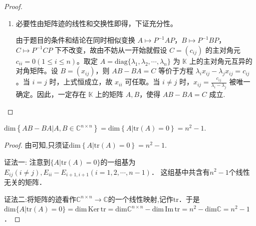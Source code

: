 \documentclass[../../main.tex]{subfiles}%
\begin{document}
\begin{proof}
\begin{enumerate}[(1)]
\item 必要性由矩阵迹的线性和交换性即得，下证充分性。

由于题目的条件和结论在同时相似变换 $A\mapsto P^{-1}AP$，$B\mapsto P^{-1}BP$，$C\mapsto P^{-1}CP$ 下不改变，故由不妨从一开始就假设 $C=(c_{ij})$ 的主对角元 $c_{ii}=0 (1\leqslant  i\leqslant  n)$。取定 $A = \mathrm{diag}\{\lambda_1,\lambda_2,\cdots,\lambda_n\}$ 为 $\mathbb{K}$ 上的主对角元互异的对角矩阵。设 $B=(x_{ij})$，则 $AB - BA = C$ 等价于方程 $\lambda_ix_{ij}-\lambda_jx_{ij}=c_{ij}$。当 $i = j$ 时，上式恒成立，故 $x_{ii}$ 可任取。当 $i\neq j$ 时，$x_{ij}=\frac{c_{ij}}{\lambda_i - \lambda_j}$ 被唯一确定。因此，一定存在 $\mathbb{K}$ 上的矩阵 $A,B$，使得 $AB - BA = C$ 成立.
\end{enumerate}

\end{proof}

\begin{corollary}\label{corollary:AB-BA的维数等于迹零矩阵的维数}
$\mathrm{dim}\left\{ AB-BA|A,B\in \mathbb{C} ^{n\times n} \right\} =\mathrm{dim}\left\{ A|\mathrm{tr}\left( A \right) =0 \right\} =n^2-1.$
\end{corollary}
\begin{proof}

由可知,只须证$\mathrm{dim}\left\{ A|\mathrm{tr}\left( A \right) =0 \right\} =n^2-1.$

{\color{blue} 证法一:}
注意到$\{ A|\mathrm{tr}(A) =0 \}$的一组基为  
$E_{ij}(i\ne j),E_{ii}-E_{i+1,i+1}(i=1,2,\cdots,n-1)$．  
这组基中共含有$n^2-1$个线性无关的矩阵．  

{\color{blue} 证法二:}将矩阵的迹看作$\mathbb{C} ^{n\times n}\rightarrow \mathbb{C}$的一个线性映射,记作$\mathrm{tr}$．于是  
$\mathrm{dim}\{ A|\mathrm{tr}(A) =0 \} = \mathrm{dim}\,\mathrm{Ker}\,\mathrm{tr} = \mathrm{dim}\mathbb{C} ^{n\times n} - \mathrm{dim}\,\mathrm{Im}\,\mathrm{tr} = n^2 - \mathrm{dim}\mathbb{C} = n^2-1$．

\end{proof}
\end{document}
